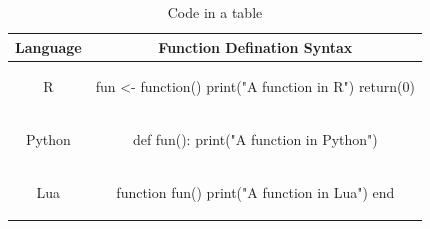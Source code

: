 \begin{table}[htbp]
\centering
  \begin{tabular}{|c | c |}
    \hline
    Language & Function Defination Syntax \\
    \hline
    R & \begin{minipage}{0.75\textwidth}
\vspace{1mm}
\begin{example}
fun <- function(){
  print("A function in R")
  return(0)
}

\end{example}
\end{minipage}\\
\hline
Python & \begin{minipage}{0.75\textwidth}
\vspace{1mm}
\begin{example}
def fun():
  print("A function in Python")

\end{example}
\end{minipage}\\
\hline

Lua & \begin{minipage}{0.75\textwidth}
\vspace{1mm}
\begin{example}
function fun()
  print("A function in Lua")
end

\end{example}
\end{minipage}\\
\hline
\end{tabular}
\caption{Code in a table}
\label{table:2}
\end{table}

